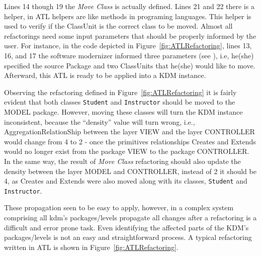 Lines 14 though 19 the \textit{Move Class} is actually defined. Lines 21 and 22 there is a helper, in ATL helpers are like methods in programing languages. This helper is used to verify if the ClassUnit is the correct class to be moved. 
Almost all refactorings need some input parameters that should be properly informed by the user. For instance, in the code depicted in Figure~\ref{fig:ATLRefactoring}, lines 13, 16, and 17 the software modernizer informed three parameters (see ), i.e, he(she) specified the source Package and two ClassUnits that he(she) would like to move.
Afterward, this ATL is ready to be applied into a KDM instance.

Observing the refactoring defined in Figure~\ref{fig:ATLRefactoring} it is fairly evident that both classes \texttt{Student} and \texttt{Instructor} should be moved to the MODEL package.
%
However, moving these classes will turn the KDM instance inconsistent, because the ``density'' value will turn wrong, i.e., AggregationRelationShip between
the layer VIEW and the layer CONTROLLER would
change from 4 to 2 - once the primitives relationships Creates
and Extends would no longer exist from the package VIEW
to the package CONTROLLER. In the same way, the result of \textit{Move Class} refactoring should also update the density between the layer
MODEL and CONTROLLER, instead of 2 it should be 4, as
Creates and Extends were also moved along with its
classes, \texttt{Student} and \texttt{Instructor}.

These propagation seen to be easy to apply, however, in a complex system comprising all kdm's packages/levels propagate all changes after a refactoring is a difficult and error prone task. Even identifying the affected parts of the KDM's packages/levels is not an easy and straightforward process. A typical refactoring written in ATL is shown in Figure~\ref{fig:ATLRefactoring}.








